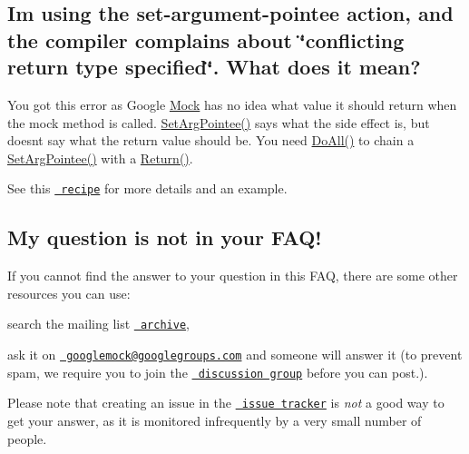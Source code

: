 \subsection*{I\textquotesingle{}m using the set-\/argument-\/pointee action, and the compiler complains about \char`\"{}conflicting return type specified\char`\"{}. What does it mean?}

You got this error as Google \mbox{\hyperlink{class_mock}{Mock}} has no idea what value it should return when the mock method is called. {\ttfamily \mbox{\hyperlink{namespacetesting_a6dbe77dc170c495ea300dd9d74ed4595}{Set\+Arg\+Pointee()}}} says what the side effect is, but doesn\textquotesingle{}t say what the return value should be. You need {\ttfamily \mbox{\hyperlink{namespacetesting_a3824c79dc6e9e05c337a675e82da2045}{Do\+All()}}} to chain a {\ttfamily \mbox{\hyperlink{namespacetesting_a6dbe77dc170c495ea300dd9d74ed4595}{Set\+Arg\+Pointee()}}} with a {\ttfamily \mbox{\hyperlink{namespacetesting_adae3994eb444d1ad2dd602454b854663}{Return()}}}.

See this \href{CookBook.md\#mocking_side_effects}{\texttt{ recipe}} for more details and an example.

\subsection*{My question is not in your F\+A\+Q!}

If you cannot find the answer to your question in this F\+AQ, there are some other resources you can use\+:


\begin{DoxyEnumerate}
\item search the mailing list \href{http://groups.google.com/group/googlemock/topics}{\texttt{ archive}},
\end{DoxyEnumerate}
\begin{DoxyEnumerate}
\item ask it on \href{mailto:googlemock@googlegroups.com}{\texttt{ googlemock@googlegroups.\+com}} and someone will answer it (to prevent spam, we require you to join the \href{http://groups.google.com/group/googlemock}{\texttt{ discussion group}} before you can post.).
\end{DoxyEnumerate}

Please note that creating an issue in the \href{https://github.com/google/googletest/issues}{\texttt{ issue tracker}} is {\itshape not} a good way to get your answer, as it is monitored infrequently by a very small number of people.

